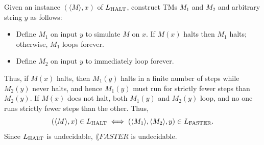 \documentclass[11pt,addpoints,answers]{exam}
\begin{document}
\begin{questions}
\begin{parts}
    \begin{solution} 
    Given an instance $(\langle M\rangle,x)$ of $L_{\text{HALT}}$, construct TMs $M_1$ and $M_2$ and arbitrary string $y$ as follows:
    \begin{itemize}
      \item Define $M_1$ on input $y$ to simulate $M$ on $x$. If $M(x)$ halts then $M_1$ halts; otherwise, $M_1$ loops forever.
      \item Define $M_2$ on input $y$ to immediately loop forever.
    \end{itemize}
    Thus, if $M(x)$ halts, then $M_1(y)$ halts in a finite number of steps while $M_2(y)$ never halts, and hence $M_1(y)$ must run for strictly fewer steps than $M_2(y)$. If $M(x)$ does not halt, both $M_1(y)$ and $M_2(y)$ loop, and no one runs strictly fewer steps than the other. Thus,
    \[
    (\langle M\rangle,x)\in L_{\text{HALT}}\iff (\langle M_1\rangle,\langle M_2\rangle,y)\in L_{\text{FASTER}}.
    \]
    Since $L_{\text{HALT}}$ is undecidable, $\lang{FASTER}$ is undecidable.
    \end{solution}
  
  \end{parts}
  
\end{questions}
\end{document}
